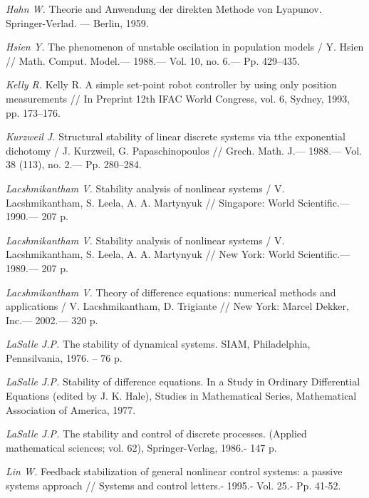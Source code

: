\begin{thebibliography}{10}
	{\it Hahn W.} Theorie and Anwendung der direkten Methode von Lyapunov. Springer-Verlad. — Berlin, 1959.
	
	{\it Hsien Y.} The phenomenon of unstable oscilation in population models / Y. Hsien // Math. Comput. Model.— 1988.— Vol. 10, no. 6.— Pp. 429–435.
	
	
	
	{\it Kelly R.} Kelly R. A simple set-point robot controller by using only position measurements // In Preprint 12th IFAC World Congress, vol. 6, Sydney, 1993, pp. 173–176.
	
	{\it Kurzweil J.} Structural stability of linear discrete systems via tthe exponential dichotomy / J. Kurzweil, G. Papaschinopoulos // Grech. Math. J.— 1988.— Vol. 38 (113), no. 2.— Pp. 280–284.
	
	{\it Lacshmikantham V.} Stability analysis of nonlinear systems / V. Lacshmikantham, S. Leela, A. A. Martynyuk // Singapore: World Scientific.— 1990.— 207 p.
	
	{\it Lacshmikantham V.} Stability analysis of nonlinear systems / V. Lacshmikantham, S. Leela, A. A. Martynyuk // New York: World Scientific.— 1989.— 207 p.
	
	{\it Lacshmikantham V.} Theory of difference equations: numerical methods and applications / V. Lacshmikantham, D. Trigiante // New York: Marcel Dekker, Inc.— 2002.— 320 p.
	
	{\it LaSalle J.P.} The stability of dynamical systems. SIAM, Philadelphia, Pennsilvania, 1976. – 76 p.
	
	{\it LaSalle J.P.} Stability of difference equations. In a Study in Ordinary Differential Equations (edited by J. K. Hale), Studies in Mathematical Series, Mathematical Association of America, 1977.
	
	{\it LaSalle J.P.} The stability and control of discrete processes. (Applied mathematical sciences; vol. 62), Springer-Verlag, 1986.- 147 p.
	
	{\it Lin W.} Feedback stabilization of general nonlinear control systems: a passive systems approach // Systems and control letters.- 1995.- Vol. 25.- Pp. 41-52.
	

\end{thebibliography}
